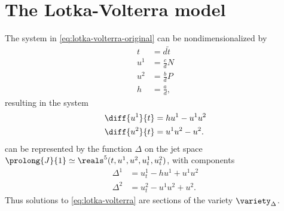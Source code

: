 \chapter{The Lotka-Volterra model}


The system in \cref{eq:lotka-volterra-original} can be nondimensionalized by
\begin{align}
  t &= d \tilde{t}\\
  u^1 &= \frac{c}{d} N\\
  u^2 &= \frac{b}{d} P\\
  h &= \frac{a}{d},
\end{align}
resulting in the system
\begin{subequations}
  \label{eq:lotka-volterra}  
  \begin{align}
    \diff{u^1}{t} &= h u^1 - u^1 u^2\\
    \diff{u^2}{t} &= u^1 u^2 - u^2.
  \end{align}
\end{subequations}
 can be represented by the function \(\Delta\) on the jet space \(\prolong{J}{1} \simeq \reals^5(t, u^1, u^2, u^1_t, u^2_t)\), with components
\begin{align}
  \Delta^1 &= u^1_t - h u^1 + u^1 u^2 \label{eq:lotka-volterra-delta1}\\
  \Delta^2 &= u^2_t - u^1 u^2 + u^2. \label{eq:lotka-volterra-delta2}
\end{align}
Thus solutions to \cref{eq:lotka-volterra} are sections of the variety \(\variety_\Delta\).


